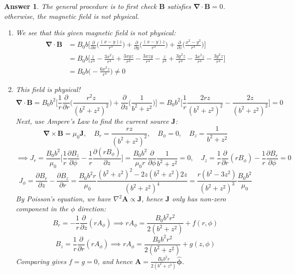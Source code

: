 \documentclass[a4paper]{article}
\newtheorem{ans}{Answer}
\theoremstyle{new}
\begin{document}
\begin{ans}
The general procedure is to first check $\mathbf{B}$ satisfies $\boldsymbol{\nabla}\cdot\mathbf{B}=0$. otherwise, the magnetic field is not physical.
\begin{enumerate}[label=(\alph*)]
\item We see that this given magnetic field is not physical: 
\begin{align}
    \boldsymbol{\nabla}\cdot\mathbf{B}&=B_0b\bigg[\frac{\partial}{\partial x}\bigg(\frac{(x-y)z}{r^3}\bigg)+\frac{\partial}{\partial y}\bigg(\frac{(x-y)z}{r^3}\bigg)+\frac{\partial}{\partial z}\bigg(\frac{x^2-y^2}{r^3}\bigg)\bigg]\nonumber\\&=B_0b\bigg[\frac{z}{r^3}-\frac{3x^2z}{r^4}+\frac{3xyz}{r^4}-\frac{3xzy}{r^4}-\frac{z}{r^3}+\frac{3y^2z}{r^4}-\frac{3x^2z}{r^4}-\frac{3y^2z}{r^4}\bigg]\nonumber\\&=B_0b\bigg(-\frac{6x^2z}{r^4}\bigg)\neq 0\nonumber
\end{align}
\item This field is physical!
$$\boldsymbol{\nabla}\cdot\mathbf{B}=B_0b^2\bigg[\frac{1}{r}\frac{\partial}{\partial r}\bigg(\frac{r^2z}{(b^2+z^2)^2}\bigg)+\frac{\partial}{\partial z}\bigg(\frac{1}{b^2+z^2}\bigg)\bigg]=B_0b^2\bigg[\frac{1}{r}\frac{2rz}{(b^2+z^2)^2}-\frac{2z}{(b^2+z^2)^2}\bigg]=0$$
Next, use Ampere's Law to find the current source $\mathbf{J}$:
$$\boldsymbol{\nabla}\times\mathbf{B}=\mu_0\mathbf{J},\quad B_r=\frac{rz}{(b^2+z^2)^2},\quad B_\phi=0,\quad B_z=\frac{1}{b^2+z^2}$$
$$\implies J_r=\frac{B_0b^2}{\mu_0}\bigg[\frac{1}{r}\frac{\partial B_z}{\partial\phi}-\frac{1}{r}\frac{\partial(rB_\phi)}{\partial z}\bigg]=\frac{B_0b^2}{\mu_0r}\frac{\partial}{\partial\phi}\frac{1}{b^2+z^2}=0,\quad J_z=\frac{1}{r}\frac{\partial}{\partial r}(rB_\phi)-\frac{1}{r}\frac{\partial B_r}{\partial\phi}=0$$
$$J_\phi=\frac{\partial B_r}{\partial z}-\frac{\partial B_z}{\partial r}=\frac{B_0b^2r}{\mu_0}\frac{(b^2+z^2)^2-2z(b^2+z^2)2z}{(b^2+z^2)^4}=\frac{r(b^2-3z^2)}{(b^2+z^2)^3}\frac{B_0b^2}{\mu_0}$$
By Poisson's equation, we have $\nabla^2\mathbf{A}\propto\mathbf{J}$, hence $\mathbf{J}$ only has non-zero component in the $\phi$ direction:
$$B_r=-\frac{1}{r}\frac{\partial}{\partial z}(rA_\phi)\implies rA_\phi=\frac{B_0b^2r^2}{2(b^2+z^2)}+f(r,\phi)$$
$$B_z=\frac{1}{r}\frac{\partial}{\partial r}(rA_\phi)\implies rA_\phi=\frac{B_0b^2r^2}{2(b^2+z^2)}+g(z,\phi)$$
Comparing gives $f=g=0$, and hence $\mathbf{A}=\frac{B_0b^2r}{2(b^2+z^2)}\boldsymbol{\hat{\phi}}$.
\end{enumerate}
\end{ans}
\end{document}
